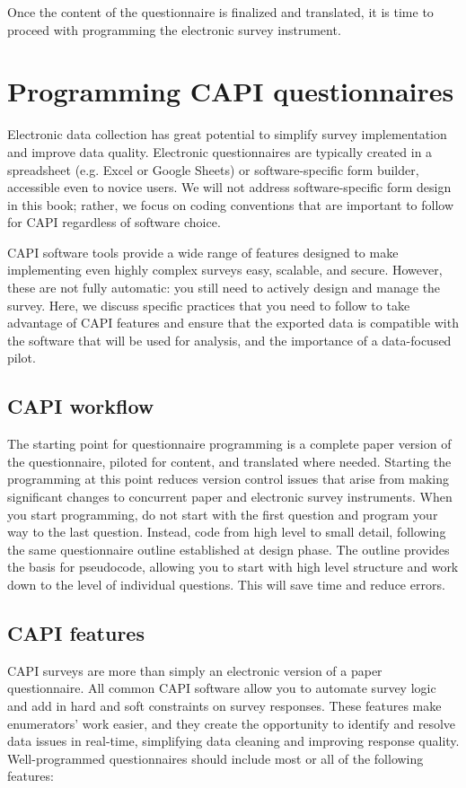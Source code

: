 {Once the content of the questionnaire is finalized and translated, it is time to proceed with programming the electronic survey instrument.


\section{Programming CAPI questionnaires}
Electronic data collection has great potential to simplify survey implementation and improve data quality. 
Electronic questionnaires are typically created in a spreadsheet (e.g. Excel or Google Sheets) or software-specific form builder, accessible even to novice users. 
We will not address software-specific form design in this book; rather, we focus on coding conventions that are important to follow for CAPI regardless of software choice. 

CAPI software tools provide a wide range of features designed to make implementing even highly complex surveys easy, scalable, and secure. 
However, these are not fully automatic: you still need to actively design and manage the survey. 
Here, we discuss specific practices that you need to follow to take advantage of CAPI features and ensure that the exported data is compatible with the software that will be used for analysis, and the importance of a data-focused pilot. 

\subsection{CAPI workflow}
The starting point for questionnaire programming is a complete paper version of the questionnaire, piloted for content, and translated where needed. 
Starting the programming at this point reduces version control issues that arise from making significant changes to concurrent paper and electronic survey instruments. 
When you start programming, do not start with the first question and program your way to the last question. 
Instead, code from high level to small detail, following the same questionnaire outline established at design phase. 
The outline provides the basis for pseudocode, allowing you to start with high level structure and work down to the level of individual questions. This will save time and reduce errors. 

\subsection{CAPI features}
CAPI surveys are more than simply an electronic version of a paper questionnaire. 
All common CAPI software allow you to automate survey logic and add in hard and soft constraints on survey responses. 
These features make enumerators' work easier, and they create the opportunity to identify and resolve data issues in real-time, simplifying data cleaning and improving response quality. 
Well-programmed questionnaires should include most or all of the following features: 

}
